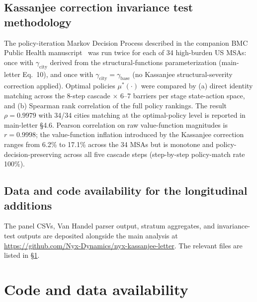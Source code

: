 \documentclass[11pt]{article}
\begin{document}
\subsection{Kassanjee correction invariance test methodology}

The policy-iteration Markov Decision Process described in the companion BMC Public Health manuscript~\cite{demidont_barriers_synergy} was run twice for each of 34 high-burden US MSAs: once with $\gamma_{\mathrm{city}}$ derived from the structural-functions parameterization (main-letter Eq.~10), and once with $\gamma_{\mathrm{city}} = \gamma_{\mathrm{base}}$ (no Kassanjee structural-severity correction applied). Optimal policies $\mu^*(\cdot)$ were compared by (a) direct identity matching across the 8-step cascade $\times$ 6--7 barriers per stage state-action space, and (b) Spearman rank correlation of the full policy rankings. The result $\rho = 0.9979$ with 34/34 cities matching at the optimal-policy level is reported in main-letter §4.6. Pearson correlation on raw value-function magnitudes is $r = 0.9998$; the value-function inflation introduced by the Kassanjee correction ranges from 6.2\% to 17.1\% across the 34 MSAs but is monotone and policy-decision-preserving across all five cascade steps (step-by-step policy-match rate 100\%).

\subsection{Data and code availability for the longitudinal additions}

The panel CSVs, Van Handel parser output, stratum aggregates, and invariance-test outputs are deposited alongside the main analysis at \url{https://github.com/Nyx-Dynamics/nyx-kassanjee-letter}. The relevant files are listed in §\ref{sec:code_data}.

\section{Code and data availability}\label{sec:code_data}
\end{document}

